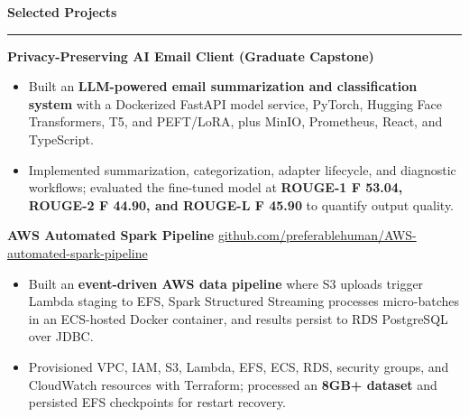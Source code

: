 \documentclass[11pt,letterpaper]{article}
\newcommand{\ressection}[1]{\Needspace{6\baselineskip}\vspace{8pt}\par\textbf{#1}\par\vspace{2pt}\hrule\vspace{5pt}}
\begin{document}
\ressection{Selected Projects}
\textbf{Privacy-Preserving AI Email Client (Graduate Capstone)}
\begin{itemize}
  \item Built an \textbf{LLM-powered email summarization and classification system} with a Dockerized FastAPI model service, PyTorch, Hugging Face Transformers, T5, and PEFT/LoRA, plus MinIO, Prometheus, React, and TypeScript.
  \item Implemented summarization, categorization, adapter lifecycle, and diagnostic workflows; evaluated the fine-tuned model at \textbf{ROUGE-1 F 53.04, ROUGE-2 F 44.90, and ROUGE-L F 45.90} to quantify output quality.
\end{itemize}
\vspace{2pt}
\textbf{AWS Automated Spark Pipeline} \hfill \href{https://github.com/preferablehuman/AWS-automated-spark-pipeline}{github.com/preferablehuman/AWS-automated-spark-pipeline}
\begin{itemize}
  \item Built an \textbf{event-driven AWS data pipeline} where S3 uploads trigger Lambda staging to EFS, Spark Structured Streaming processes micro-batches in an ECS-hosted Docker container, and results persist to RDS PostgreSQL over JDBC.
  \item Provisioned VPC, IAM, S3, Lambda, EFS, ECS, RDS, security groups, and CloudWatch resources with Terraform; processed an \textbf{8GB+ dataset} and persisted EFS checkpoints for restart recovery.
\end{itemize}
\end{document}

